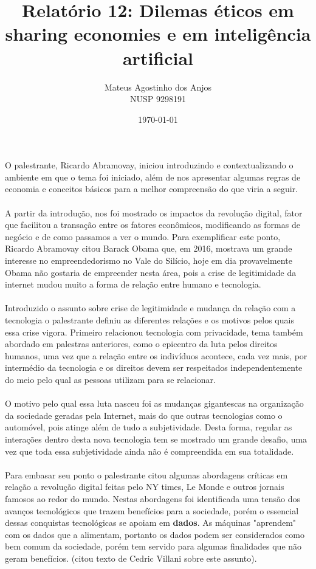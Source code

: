 \documentclass[12pt]{article}
\title{Relatório 12: Dilemas éticos em sharing economies e em inteligência artificial}
\author{Mateus Agostinho dos Anjos\\NUSP 9298191}
\date{\today}
\begin{document}
	\maketitle
	\paragraph{}
		O palestrante, Ricardo Abramovay, iniciou introduzindo e contextualizando
		o ambiente em que o tema foi iniciado, além de nos apresentar algumas
		regras de economia e conceitos básicos para a melhor compreensão
		do que viria a seguir.
	\paragraph{}
		A partir da introdução, nos foi mostrado os impactos da revolução digital,
		fator que facilitou a transação entre os fatores econômicos, modificando
		as formas de negócio e de como passamos a ver o mundo. Para exemplificar
		este ponto, Ricardo Abramovay citou Barack Obama que, em 2016, 
		mostrava um grande interesse no empreendedorismo no Vale do Silício,
		hoje em dia provavelmente Obama não gostaria de empreender nesta área, 
		pois a crise de legitimidade da internet mudou muito a forma de relação
		entre humano e tecnologia.
	\paragraph{}
		Introduzido o assunto sobre crise de legitimidade e mudança da relação
		com a tecnologia o palestrante definiu as diferentes relações e os
		motivos pelos quais essa crise vigora. Primeiro relacionou tecnologia com
		privacidade, tema também abordado em palestras anteriores, como
		o epicentro da luta pelos direitos humanos, uma vez que a relação entre
		os indivíduos acontece, cada vez mais, por intermédio da tecnologia e
		os direitos devem ser respeitados independentemente do meio pelo qual
		as pessoas utilizam para se relacionar.
	\paragraph{}
		O motivo pelo qual essa luta nasceu foi as mudanças gigantescas na 
		organização da sociedade geradas pela Internet, mais do que outras
		tecnologias como o automóvel, pois atinge além de tudo a subjetividade.
		Desta forma, regular as interações dentro desta nova tecnologia tem
		se mostrado um grande desafio, uma vez que toda essa subjetividade
		ainda não é compreendida em sua totalidade.
	\paragraph{}
		Para embasar seu ponto o palestrante citou algumas abordagens críticas
		em relação a revolução digital feitas pelo NY times, Le Monde e outros
		jornais famosos ao redor do mundo. Nestas abordagens foi identificada
		uma tensão dos avanços tecnológicos que trazem benefícios para a sociedade, 
		porém o essencial dessas conquistas tecnológicas se apoiam em 
		\textbf{dados}. As máquinas "aprendem" com os dados que a alimentam,
		portanto os dados podem ser considerados como bem comum da sociedade, 
		porém tem servido para algumas finalidades que não geram benefícios. (citou
		texto de Cedric Villani sobre este assunto).
\end{document}
